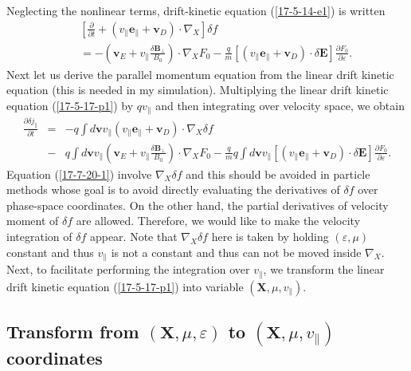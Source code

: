 \documentclass{article}
\begin{document}
Neglecting the nonlinear terms, drift-kinetic equation (\ref{17-5-14-e1}) is
written
\begin{eqnarray}
  &  & \left[ \frac{\partial}{\partial t} + (v_{\parallel}
  \mathbf{e}_{\parallel} +\mathbf{v}_D) \cdot \nabla_X \right] \delta f
  \nonumber\\
  &  & = - \left( \mathbf{v}_E + v_{\parallel} \frac{\delta
  \mathbf{B}_{\perp}}{B_0} \right) \cdot \nabla_X F_0 - \frac{q}{m}
  [(v_{\parallel} \mathbf{e}_{\parallel} +\mathbf{v}_D) \cdot \delta
  \mathbf{E}] \frac{\partial F_0}{\partial \varepsilon} .  \label{17-5-17-p1}
\end{eqnarray}
Next let us derive the parallel momentum equation from the linear drift
kinetic equation (this is needed in my simulation). Multiplying the linear
drift kinetic equation (\ref{17-5-17-p1}) by $q v_{\parallel}$ and then
integrating over velocity space, we obtain
\begin{eqnarray}
  \frac{\partial \delta j_{\parallel}}{\partial t} & = & - q \int
  d\mathbf{v}v_{\parallel} (v_{\parallel} \mathbf{e}_{\parallel}
  +\mathbf{v}_D) \cdot \nabla_X \delta f \nonumber\\
  & - & q \int d\mathbf{v}v_{\parallel} \left( \mathbf{v}_E + v_{\parallel}
  \frac{\delta \mathbf{B}_{\perp}}{B_0} \right) \cdot \nabla_X F_0 -
  \frac{q}{m} q \int d\mathbf{v}v_{\parallel} [(v_{\parallel}
  \mathbf{e}_{\parallel} +\mathbf{v}_D) \cdot \delta \mathbf{E}]
  \frac{\partial F_0}{\partial \varepsilon} .  \label{17-7-20-1}
\end{eqnarray}
Equation (\ref{17-7-20-1}) involve $\nabla_X \delta f$ and this should be
avoided in particle methods whose goal is to avoid directly evaluating the
derivatives of $\delta f$ over phase-space coordinates. On the other hand, the
partial derivatives of velocity moment of $\delta f$ are allowed. Therefore,
we would like to make the velocity integration of $\delta f$ appear. Note that
$\nabla_X \delta f$ here is taken by holding $(\varepsilon, \mu)$ constant and
thus $v_{\parallel}$ is not a constant and thus can not be moved inside
$\nabla_X$. Next, to facilitate performing the integration over
$v_{\parallel}$, we transform the linear drift kinetic equation
(\ref{17-5-17-p1}) into variable $(\mathbf{X}, \mu, v_{\parallel})$.

\subsection{Transform from $(\mathbf{X}, \mu, \varepsilon)$ to $(\mathbf{X},
\mu, v_{\parallel})$ coordinates}\label{17-6-16-e1}
\end{document}
